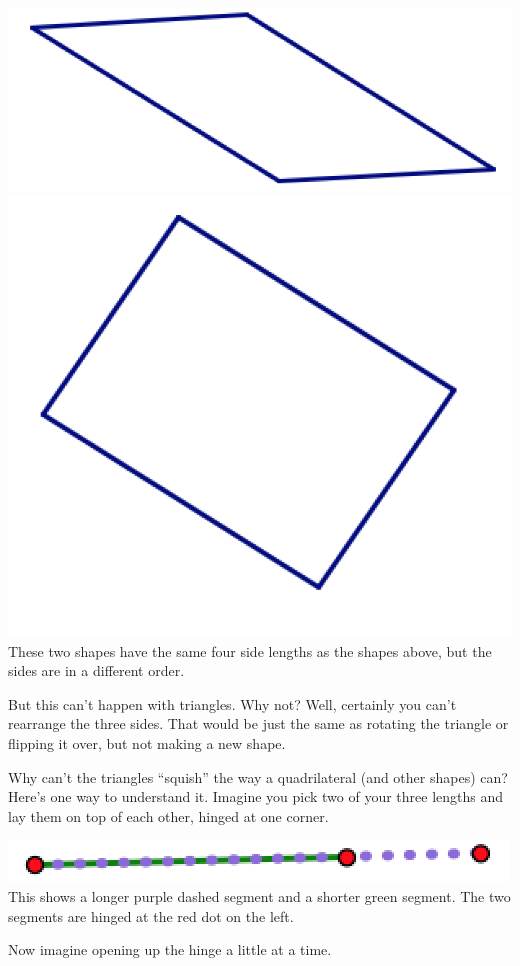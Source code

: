 \begin{center}
\bigskip
\includegraphics[scale = .45]{pgram1}
\qquad
\includegraphics[scale = .45]{pgram2}\\
These two shapes have the same four side lengths as the shapes above, but the sides are in a different order.
\end{center}

\bigskip

But this can't happen with triangles.  Why not?  Well, certainly you can't rearrange the three sides.  That would be just the same as rotating the triangle or flipping it over, but not making a new shape.

Why can't the triangles ``squish'' the way a quadrilateral (and other shapes) can?  Here's one way to understand it.  Imagine you pick two of your three lengths and lay them on top of each other, hinged at one corner.



\begin{center}
\includegraphics[scale = .4]{hinge}\\
 This shows a longer purple dashed segment and a shorter green segment.  The two segments are hinged at the red dot on the left.
\end{center}
Now imagine opening up the hinge a little at a time.

